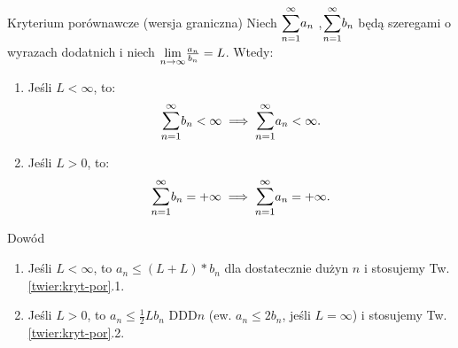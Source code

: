 \documentclass{article}
\numberwithin{defi}{section}
\numberwithin{defi}{section}
\newcommand{\oo}{\infty}
\providecommand{\half}{\frac{1}{2}}
\newcommand{\bsum}[2]{\mathlarger{\sum_{#1}^{#2}}}
\newcommand{\szerI}[1]{\bsum{n=1}{\oo} #1_n}
\begin{document}
\begin{twier}{Kryterium porównawcze (wersja graniczna)}
    Niech $\szerI{a}$ ,$\szerI{b}$ będą szeregami o wyrazach dodatnich i niech $\mathlarger{\lim}_{n \to \oo} \frac{a_n}{b_n} = L$. Wtedy: \begin{enumerate}
        \item Jeśli $L < \oo$, to: \begin{equation}
            \szerI{b} < \oo \implies \szerI{a} < \oo.
        \end{equation}
        \item Jeśli $ L > 0$, to: \begin{equation}
            \szerI{b} = +\oo \implies \szerI{a} = +\oo.
        \end{equation}
    \end{enumerate}
\end{twier}


\begin{dow}{Dowód}
    \begin{enumerate}
        \item Jeśli $L < \oo$, to $a_n \leqslant  (L + L) * b_n$ dla dostatecznie dużyn $n$ i stosujemy  Tw. \ref{twier:kryt-por}.1.
        \item Jeśli $L > 0$, to $a_n \leqslant \half L b_n$ DDD$n$ (ew. $a_n \leqslant 2 b_n$, jeśli $L = \oo$) i stosujemy Tw. \ref{twier:kryt-por}.2.
    \end{enumerate}
\end{dow}
\end{document}
